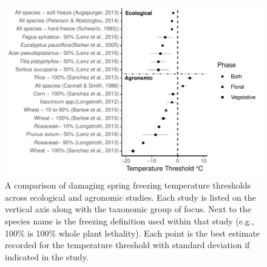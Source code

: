\documentclass{article}\usepackage[]{graphicx}\usepackage[]{color}
\makeatletter
\def\maxwidth{ %
  \ifdim\Gin@nat@width>\linewidth
    \linewidth
  \else
    \Gin@nat@width
  \fi
}
\makeatother
\begin{document}
\begin{figure}[H]

{\centering \includegraphics[width=\maxwidth]{figure/temp-1} 

}

\caption[A comparison of damaging spring freezing temperature thresholds across ecological and agronomic studies]{A comparison of damaging spring freezing temperature thresholds across ecological and agronomic studies. Each study is listed on the vertical axis along with the taxonomic group of focus. Next to the species name is the freezing definition used within that study (e.g., 100\% is 100\% whole plant lethality). Each point is the best estimate recorded for the temperature threshold with standard deviation if indicated in the study.}\label{fig:temp}
\end{figure}
\end{document}
